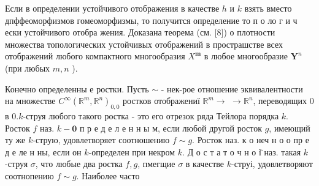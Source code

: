 \documentclass[10pt]{article}
\begin{document}
Если в определении устойчивого отображения в качестве $h$ и $k$ взять вместо дпффеоморфизмов гомеоморфизмы, то получится определение то п о ло г и ч ески устойчивого отобра жения. Доказана теорема (см. [8]) о плотности множества топологических устойчивых отображений в прострашстве всех отображений любого компактного многообразия $X^{\boldsymbol{m}}$ в любое многообразие $\boldsymbol{Y}^{n}$ (при любых $m, n$ ).



Конечно определенны е ростки. Пусть $\sim$ - нек-рое отношение эквивалентности на множестве $C^{\infty}\left(\mathbb{R}^{m}, \mathbb{R}^{n}\right)_{0,0}$ ростков отображениї $\mathbb{R}^{m} \rightarrow$ $\rightarrow \mathbb{R}^{n}$, переводящих 0 в $0 . k$-струя любого такого ростка - это его отрезок ряда Тейлора порядка $k$. Росток $f$ наз. $k-\mathbf{0}$ п р е д е л е н н ы м, если любой другой росток $g$, имеющий ту же $k$-струю, удовлетворяет соотношению $f \sim g$. Росток наз. к о неч н о о пр е д е ле н ны, если он $k$-определен при некром $k$. Д о с т а т о ч н о ї̈ наз. такая $k$-струя $\sigma$, что любые два ростка $f, g$, пмегщие $\sigma$ в качестве $k$-струі, удовлетворяют соотнопению $f \sim g$. Наиболее часто
\end{document}
